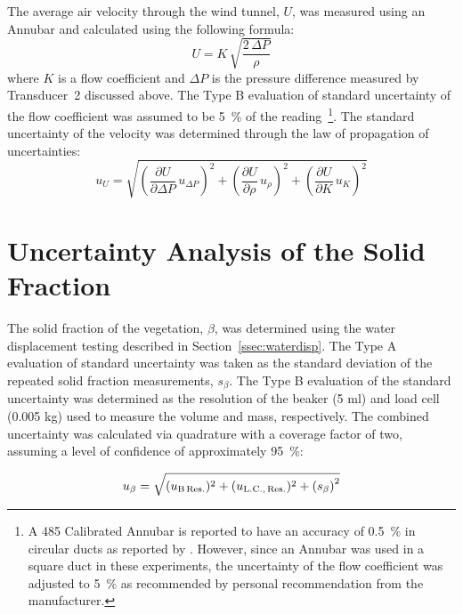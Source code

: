 \documentclass[12pt]{article}
\begin{document}
The average air velocity through the wind tunnel, $U$, was measured using an Annubar and calculated using the following formula:
\begin{equation}
\label{eq:Velocity}
U = K \, \sqrt{\frac{2 \, \Delta P}{\rho}}
\end{equation}
where $K$ is a flow coefficient and $\Delta P$ is the pressure difference measured by Transducer~2 discussed above. The Type B evaluation of standard uncertainty of the flow coefficient was assumed to be 5~\% of the reading~\footnote{A 485 Calibrated Annubar is reported to have an accuracy of 0.5~\% in circular ducts as reported by \cite{Annubar}. However, since an Annubar was used in a square duct in these experiments, the uncertainty of the flow coefficient was adjusted to 5~\% as recommended by personal recommendation from the manufacturer.}. The standard uncertainty of the velocity was determined through the law of propagation of uncertainties:
\begin{equation}
\label{eq:Velocityuncertainty}
u_{\scriptscriptstyle U} = \sqrt{{\left( \frac{\partial U}{\partial \Delta P}\,u_{\scriptscriptstyle \Delta P} \right) }^2+{\left(\frac{\partial U}{\partial \rho}\,u_{\scriptscriptstyle \rho}\right)}^2+{\left(\frac{\partial U}{\partial K}\,u_{\scriptscriptstyle K}\right)}^2}
\end{equation}

\pagebreak

\section{Uncertainty Analysis of the Solid Fraction} \label{sec:UncertaintySolidFrac}

The solid fraction of the vegetation, $\beta$, was determined using the water displacement testing described in Section~\ref{ssec:waterdisp}. The Type A evaluation of standard uncertainty was taken as the standard deviation of the repeated solid fraction measurements, $s_{\scriptscriptstyle \beta}$. The Type B evaluation of the standard uncertainty was determined as the resolution of the beaker (5 ml) and load cell (0.005 kg) used to measure the volume and mass, respectively. The combined uncertainty was calculated via quadrature with a coverage factor of two, assuming a level of confidence of approximately 95~\%:

\begin{equation}
\label{eq:betauncertainty}
u_{\beta} = \sqrt{{(u_{\rm{B\,Res.}})^2+(u_{\rm{L.C.,\,Res.}})^2+(s_{\beta})}^2}
\end{equation}
\end{document}
